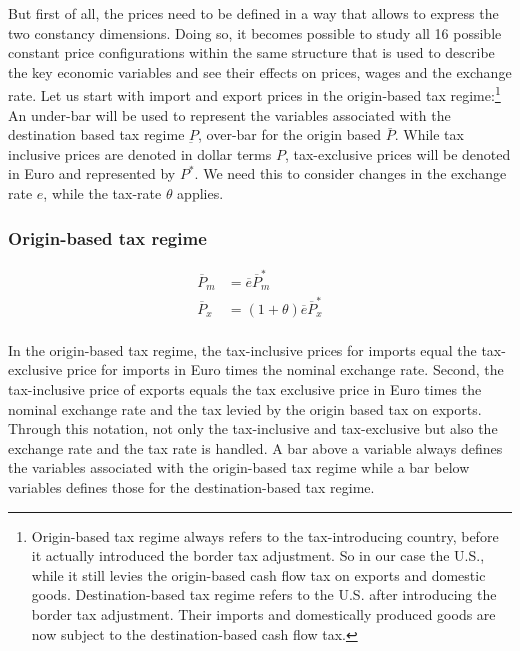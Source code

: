 But first of all, the prices need to be defined in a way that allows to express the two constancy dimensions. Doing so, it becomes possible to study all 16 possible constant price configurations within the same structure that is used to describe the key economic variables and see their effects on prices, wages and the exchange rate.
Let us start with import and export prices in the origin-based tax regime:\footnote{Origin-based tax regime always refers to the tax-introducing country, before it actually introduced the border tax adjustment. So in our case the U.S., while it still levies the origin-based cash flow tax on exports and domestic goods. Destination-based tax regime refers to the U.S. after introducing the border tax adjustment. Their imports and domestically produced goods are now subject to the destination-based cash flow tax.} \\

An under-bar will be used to represent the variables associated with the destination based tax regime $\underbar P$, over-bar for the origin based $\bar P$. While tax inclusive prices are denoted in dollar terms $P$, tax-exclusive prices will be denoted in Euro and represented by $P^*$. We need this to consider changes in the exchange rate $e$, while the tax-rate $\theta$ applies. 

\subsubsection*{Origin-based tax regime}

\begin{equation}\label{O.Tax}
\begin{aligned}
    \overline P_m &= \overline e\overline P^*_m \\
    \overline P_x &= \left( 1+\theta \right) \overline e\overline P^*_x \\
\end{aligned}
\end{equation}

\noindent In the origin-based tax regime, the tax-inclusive prices for imports equal the tax-exclusive price for imports in Euro times the nominal exchange rate. Second, the tax-inclusive price of exports equals the tax exclusive price in Euro times the nominal exchange rate and the tax levied by the origin based tax on exports. Through this notation, not only the tax-inclusive and tax-exclusive but also the exchange rate and the tax rate is handled. A bar above a variable always defines the variables associated with the origin-based tax regime while a bar below variables  defines those for the destination-based tax regime.

